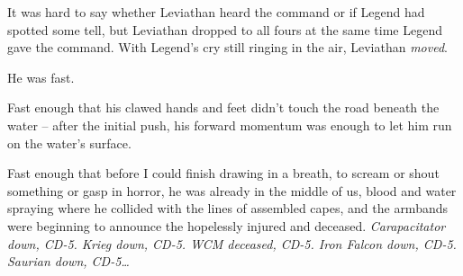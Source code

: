 It was hard to say whether Leviathan heard the command or if Legend had spotted some tell, but Leviathan dropped to all fours at the same time Legend gave the command. With Legend's cry still ringing in the air, Leviathan \emph{moved}.



He was fast.



Fast enough that his clawed hands and feet didn't touch the road beneath the water – after the initial push, his forward momentum was enough to let him run on the water's surface.



Fast enough that before I could finish drawing in a breath, to scream or shout something or gasp in horror, he was already in the middle of us, blood and water spraying where he collided with the lines of assembled capes, and the armbands were beginning to announce the hopelessly injured and deceased.  \emph{Carapacitator down, CD-5.   Krieg down, CD-5.  WCM deceased, CD-5.  Iron Falcon down, CD-5.  Saurian down, CD-5\ldots}





